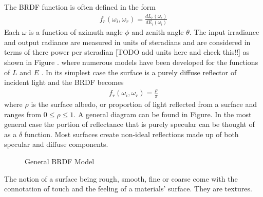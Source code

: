 The BRDF function is often defined in the form
%
\begin{align}
    f_r(\omega_i, \omega_r) = \frac{dL_r(\omega_r)}{dE_i(\omega_i)}
\end{align}
%
Each $\omega$ is a function of azimuth angle $\phi$ and zenith angle $\theta$. The input irradiance and output radiance are measured in units of steradians and are considered in terms of there power per steradian [TODO add units here and check this!!] as shown in Figure .
where numerous models have been developed for the functions of $L$ and $E$ \cite{sparrow}\cite{brdfoverview}.  In its simplest case the surface is a purely diffuse reflector of incident light and the BRDF becomes
%
\begin{align}
    f_r(\omega_i, \omega_r) = \frac{\rho}{\pi}
\end{align}
%
where $\rho$ is the surface albedo, or proportion of light reflected from a surface \cite{nicodemus} and ranges from $0\leq\rho\leq1$.  A general diagram can be found in Figure.  In the most general case the portion of reflectance that is purely specular can be thought of as a $\delta$ function.  Most surfaces create non-ideal reflections made up of both specular and diffuse components.
%
\begin{figure}
    \begin{center}
    \end{center}
    \caption{General BRDF Model}
    \label{fig:scattering}
\end{figure}
%
The notion of a surface being rough, smooth, fine or coarse come with the connotation of touch and the feeling of a materials' surface.  They are textures.
